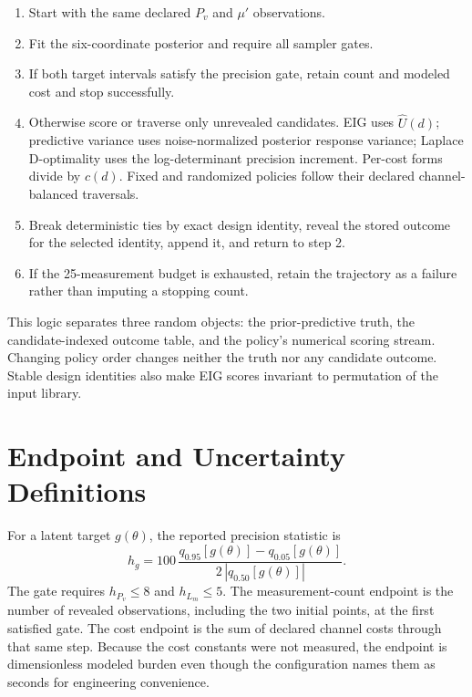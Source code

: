 \begin{enumerate}
\def\labelenumi{\arabic{enumi}.}
\item
  Start with the same declared \(P_v\) and \(\mu'\) observations.
\item
  Fit the six-coordinate posterior and require all sampler gates.
\item
  If both target intervals satisfy the precision gate, retain count and
  modeled cost and stop successfully.
\item
  Otherwise score or traverse only unrevealed candidates. EIG uses
  \(\widehat U(d)\); predictive variance uses noise-normalized posterior
  response variance; Laplace D-optimality uses the log-determinant
  precision increment. Per-cost forms divide by \(c(d)\). Fixed and
  randomized policies follow their declared channel-balanced traversals.
\item
  Break deterministic ties by exact design identity, reveal the stored
  outcome for the selected identity, append it, and return to step 2.
\item
  If the 25-measurement budget is exhausted, retain the trajectory as a
  failure rather than imputing a stopping count.
\end{enumerate}

This logic separates three random objects: the prior-predictive truth,
the candidate-indexed outcome table, and the policy's numerical scoring
stream. Changing policy order changes neither the truth nor any
candidate outcome. Stable design identities also make EIG scores
invariant to permutation of the input library.

\hypertarget{endpoint-and-uncertainty-definitions}{%
\section{Endpoint and Uncertainty
Definitions}\label{endpoint-and-uncertainty-definitions}}

For a latent target \(g(\theta)\), the reported precision statistic is
\[h_g=100\,\frac{q_{0.95}[g(\theta)]-q_{0.05}[g(\theta)]}
 {2\,|q_{0.50}[g(\theta)]|}.\] The gate requires \(h_{P_v}\leq8\) and
\(h_{L_m}\leq5\). The measurement-count endpoint is the number of
revealed observations, including the two initial points, at the first
satisfied gate. The cost endpoint is the sum of declared channel costs
through that same step. Because the cost constants were not measured,
the endpoint is dimensionless modeled burden even though the
configuration names them as seconds for engineering convenience.

